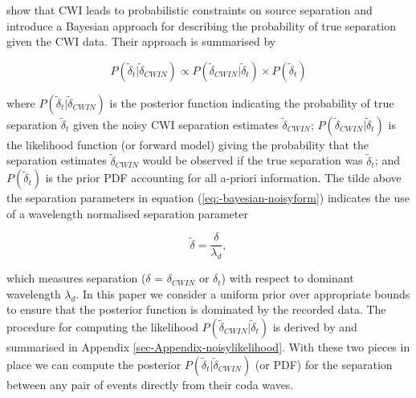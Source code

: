 \documentclass[12pt,double]{article}
\begin{document}
\citet{dr_Robinson11a} show that CWI leads to
probabilistic constraints on source separation and introduce a
Bayesian approach for describing the probability of true separation
given the CWI data. Their approach is summarised by
\begin{linenomath*} \begin{equation}
\label{eq:-bayesian-noisyform}
P(\widetilde{\delta}_t|\widetilde{\delta}_{CWIN}) \propto P(\widetilde{\delta}_{CWIN}|\widetilde{\delta}_t)
\times P(\widetilde{\delta}_t)
\end{equation} \end{linenomath*}
where  $P(\widetilde{\delta}_t|\widetilde{\delta}_{CWIN})$ is the
posterior function indicating the probability of true separation
$\widetilde{\delta}_t$ given the noisy CWI separation estimates
$\widetilde{\delta}_{CWIN}$;
$P(\widetilde{\delta}_{CWIN}|\widetilde{\delta}_t)$ is the
likelihood function (or forward model) giving the probability that
the separation estimates $\widetilde{\delta}_{CWIN}$ would be
observed if the true separation was $\widetilde{\delta}_t$; and
$P(\widetilde{\delta}_t)$ is the prior PDF accounting for all
a-priori information. The tilde above the separation parameters in
equation (\ref{eq:-bayesian-noisyform}) indicates the use of a
wavelength normalised separation parameter
\begin{linenomath*} \begin{equation} 
\label{eq-normalisation-eqn}
\widetilde{\delta} = \frac{\delta}{\lambda_{d}},
\end{equation} \end{linenomath*}
which measures separation ($\delta$ = $\delta_{CWIN}$ or $\delta_t$)
with respect to dominant wavelength $\lambda_{d}$. In this paper we
consider a uniform prior over appropriate bounds to ensure that the
posterior function is dominated by the recorded data.
The procedure for computing the likelihood
$P(\widetilde{\delta}_{CWIN}|\widetilde{\delta}_t)$ is derived by
\citet{dr_Robinson11a} and summarised in Appendix
\ref{sec-Appendix-noisylikelihood}. With these two pieces in place
we can compute the posterior
$P(\widetilde{\delta}_t|\widetilde{\delta}_{CWIN})$ (or PDF) for the
separation between any pair of events directly from their coda
waves.
\end{document}
